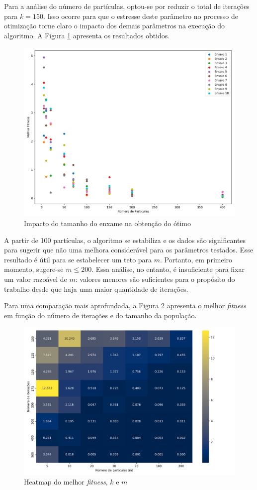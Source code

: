 \documentclass[12pt]{article}
\begin{document}
	Para a análise do número de partículas, optou-se por reduzir o total de iterações para $k=150$. Isso ocorre para que o estresse deste parâmetro no processo de otimização torne claro o impacto dos demais parâmetros na execução do algoritmo. A Figura \ref{fig_variandom} apresenta os resultados obtidos. 
	 
	\begin{figure}[h]
		\centering
		\includegraphics[width=0.7\linewidth]{../variando_m}
		\caption{Impacto do tamanho do enxame na obtenção do ótimo}
		\label{fig_variandom}
	\end{figure}
	A partir de 100 partículas, o algoritmo se estabiliza e os dados são significantes para sugerir que não uma melhora considerável para os parâmetros testados. Esse resultado é útil para se estabelecer um teto para $m$. Portanto, em primeiro momento, sugere-se $m \leq 200$. Essa análise, no entanto, é insuficiente para fixar um valor razoável de $m$: valores menores são suficientes para o propósito do trabalho desde que haja uma maior quantidade de iterações. 
	
	Para uma comparação mais aprofundada, a Figura \ref{fig_heatmapfitness} apresenta o melhor \textit{fitness} em função do número de iterações e do tamanho da população. 
	\begin{figure}[h!]
		\centering
		\includegraphics[width=0.7\linewidth]{../heatmap_fitness_novo}
		\caption{Heatmap do melhor \textit{fitness}, $k$ e $m$}
		\label{fig_heatmapfitness}
	\end{figure}
	
\end{document}
